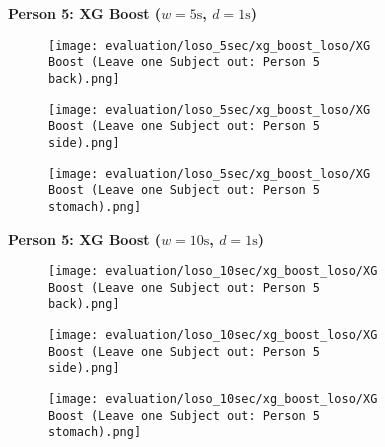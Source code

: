 \begin{figure}
    \textbf{Person 5: XG Boost ($w=5\si{\s}$, $d=1\si{\s}$)}
      \centering
      \begin{subfigure}{1\textwidth}
          \texttt{[image: evaluation/loso\_5sec/xg\_boost\_loso/XG Boost (Leave one Subject out: Person 5 back).png]}
        \end{subfigure}
        \begin{subfigure}{1\textwidth}
          \texttt{[image: evaluation/loso\_5sec/xg\_boost\_loso/XG Boost (Leave one Subject out: Person 5 side).png]}
        \end{subfigure}
        \begin{subfigure}{1\textwidth}
          \texttt{[image: evaluation/loso\_5sec/xg\_boost\_loso/XG Boost (Leave one Subject out: Person 5 stomach).png]}
      \end{subfigure}
        \textbf{Person 5: XG Boost ($w=10\si{\s}$, $d=1\si{\s}$)}
      \centering
      \begin{subfigure}{1\textwidth}
          \texttt{[image: evaluation/loso\_10sec/xg\_boost\_loso/XG Boost (Leave one Subject out: Person 5 back).png]}
        \end{subfigure}
        \begin{subfigure}{1\textwidth}
          \texttt{[image: evaluation/loso\_10sec/xg\_boost\_loso/XG Boost (Leave one Subject out: Person 5 side).png]}
        \end{subfigure}
        \begin{subfigure}{1\textwidth}
          \texttt{[image: evaluation/loso\_10sec/xg\_boost\_loso/XG Boost (Leave one Subject out: Person 5 stomach).png]}
      \end{subfigure}
  
      \label{evaluation:xgboost_loso:person6}
\end{figure}

